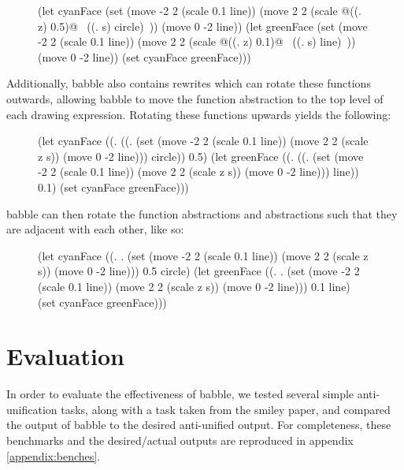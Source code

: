 \documentclass[acmsmall,nonacm]{acmart}\settopmatter{}
\begin{document}
\begin{figure}[h]
  \begin{nanoml}
(let cyanFace (set (move -2 2 (scale 0.1 line)) (move 2 2 (scale @((\z. z) 0.5)@ ~((\s. s) circle)~)) (move 0 -2 line))
  (let greenFace (set (move -2 2 (scale 0.1 line)) (move 2 2 (scale @((\z. z) 0.1)@ ~((\s. s) line)~)) (move 0 -2 line))
      (set cyanFace greenFace)))
  \end{nanoml}

  \label{fig:au1}
  \vspace{0.5em}
\end{figure}

Additionally, babble also contains rewrites which can rotate these functions outwards, allowing babble to move the function abstraction to the top level of each drawing expression. Rotating these functions upwards yields the following:
  
\begin{figure}[h]
  \begin{nanoml}
(let cyanFace ((\z. ((\s. (set (move -2 2 (scale 0.1 line)) (move 2 2 (scale z s)) (move 0 -2 line))) circle)) 0.5)
  (let greenFace ((\z. ((\s. (set (move -2 2 (scale 0.1 line)) (move 2 2 (scale z s)) (move 0 -2 line))) line)) 0.1)
      (set cyanFace greenFace)))
  \end{nanoml}

  \label{fig:au2}
\end{figure}

babble can then rotate the function abstractions and abstractions such that they are adjacent with each other, like so:

\begin{figure}[h]
  \begin{nanoml}
(let cyanFace ((\z. \s. (set (move -2 2 (scale 0.1 line)) (move 2 2 (scale z s)) (move 0 -2 line))) 0.5 circle)
  (let greenFace ((\z. \s. (set (move -2 2 (scale 0.1 line)) (move 2 2 (scale z s)) (move 0 -2 line))) 0.1 line)
      (set cyanFace greenFace)))
  \end{nanoml}

  \label{fig:au3}
\end{figure}

\section{Evaluation}

In order to evaluate the effectiveness of babble, we tested several simple anti-unification tasks, along with a task taken from the smiley paper, and compared the output of babble to the desired anti-unified output. For completeness, these benchmarks and the desired/actual outputs are reproduced in appendix \ref{appendix:benches}.
\end{document}
